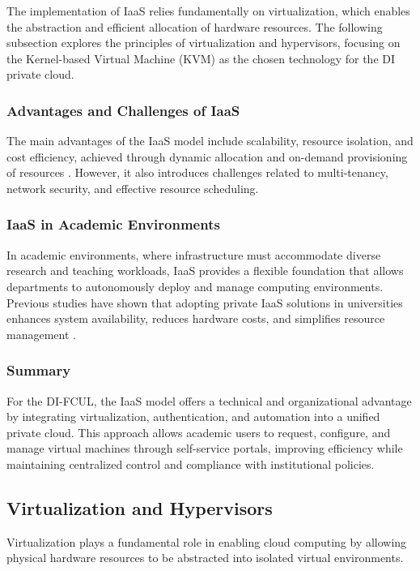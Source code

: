 \documentclass[sigplan]{acmart}
\begin{document}
            The implementation of IaaS relies fundamentally on virtualization, which enables the abstraction and efficient allocation of hardware resources. The following subsection explores the principles of virtualization and hypervisors, focusing on the Kernel-based Virtual Machine (KVM) as the chosen technology for the DI private cloud.
            
            \subsubsection{Advantages and Challenges of IaaS}
                The main advantages of the IaaS model include scalability, resource isolation, and cost efficiency, achieved through dynamic allocation and on-demand provisioning of resources \cite{armbrustCloudsBerkeleyView2009}. However, it also introduces challenges related to multi-tenancy, network security, and effective resource scheduling.
            
            \subsubsection{IaaS in Academic Environments}
                In academic environments, where infrastructure must accommodate diverse research and teaching workloads, IaaS provides a flexible foundation that allows departments to autonomously deploy and manage computing environments. Previous studies have shown that adopting private IaaS solutions in universities enhances system availability, reduces hardware costs, and simplifies resource management \cite{alvesUsingCloudBuild2014,bonnerUsingOpenStackImprove2013,oleksiukExperienceMaintenanceAcademic2021}.

            \subsubsection{Summary}    
                For the DI-FCUL, the IaaS model offers a technical and organizational advantage by integrating virtualization, authentication, and automation into a unified private cloud. This approach allows academic users to request, configure, and manage virtual machines through self-service portals, improving efficiency while maintaining centralized control and compliance with institutional policies.


    \subsection{Virtualization and Hypervisors} \label{sec:background.virtualization}
        Virtualization plays a fundamental role in enabling cloud computing by allowing physical hardware resources to be abstracted into isolated virtual environments. \\
        
\end{document}
